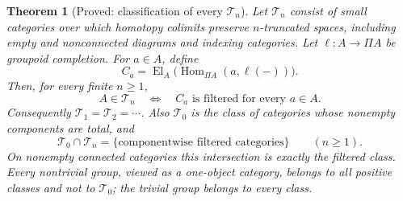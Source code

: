 \documentclass[11pt,a4paper]{article}
\newcommand{\El}{\operatorname{El}}
\newcommand{\Hom}{\operatorname{Hom}}
\newtheorem{theorem}{Theorem}[section]
\theoremstyle{definition}
\begin{document}
\begin{theorem}[Proved: classification of every $\mathcal T_n$]\label{D:Tn-classification}
Let $\mathcal T_n$ consist of small categories over which homotopy
colimits preserve $n$-truncated spaces, including empty and
nonconnected diagrams and indexing categories. Let
$\ell:A\to\Pi A$ be groupoid completion. For $a\in A$, define
\[
C_a=\El_A\bigl(\Hom_{\Pi A}(a,\ell(-))\bigr).
\]
Then, for every finite $n\geq1$,
\[
A\in\mathcal T_n\quad\Longleftrightarrow\quad
C_a\text{ is filtered for every }a\in A.
\]
Consequently $\mathcal T_1=\mathcal T_2=\cdots$. Also
$\mathcal T_0$ is the class of categories whose nonempty components
are total, and
\[
\mathcal T_0\cap\mathcal T_n
=\{\text{componentwise filtered categories}\}\qquad(n\geq1).
\]
On nonempty connected categories this intersection is exactly the
filtered class. Every nontrivial group, viewed as a one-object
category, belongs to all positive classes and not to
$\mathcal T_0$; the trivial group belongs to every class.
\end{theorem}
\end{document}
